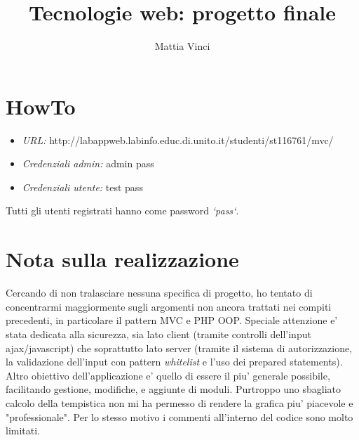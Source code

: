 \documentclass{article}
\begin{document}
\title{Tecnologie web: progetto finale}
\author{Mattia Vinci}

\maketitle


\section{HowTo}
\begin{itemize}
\item \emph{URL:} http://labappweb.labinfo.educ.di.unito.it/studenti/st116761/mvc/
\item \emph{Credenziali admin:} admin pass
\item \emph{Credenziali utente:} test pass
\end{itemize}
Tutti gli utenti registrati hanno come password \emph{`pass`}.




\section{Nota sulla realizzazione}
Cercando di non tralasciare nessuna specifica di progetto, ho tentato di concentrarmi maggiormente sugli argomenti non ancora trattati nei compiti precedenti, in particolare il pattern MVC e PHP OOP. Speciale attenzione e' stata dedicata alla sicurezza, sia lato client (tramite controlli dell'input ajax/javascript) che soprattutto lato server (tramite il sistema di autorizzazione, la validazione dell'input con pattern \emph{whitelist} e l'uso dei prepared statements).\\
Altro obiettivo dell'applicazione e' quello di essere il piu' generale possibile, facilitando gestione, modifiche, e aggiunte di moduli.
Purtroppo uno sbagliato calcolo della tempistica non mi ha permesso di rendere la grafica piu' piacevole e "professionale". Per lo stesso motivo i commenti all'interno del codice sono molto limitati.
\end{document}
